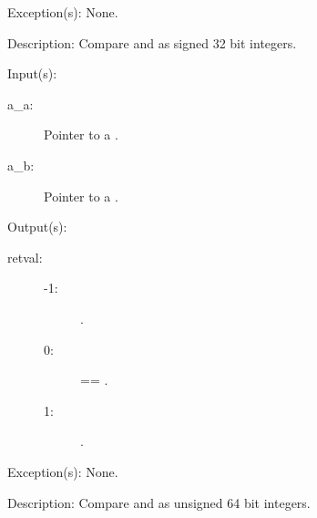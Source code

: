 \begin{capi}
\begin{capilist}
\begin{description}
		\end{description}
	\item[Exception(s): ] None.
	\item[Description: ]
		Compare  and  as signed 32 bit
		integers.
	\end{capilist}
\label{bhp_priority_compare_uint64}
	\begin{capilist}
	\item[Input(s): ]
		\begin{description}\item[]
		\item[a\_a: ]
			Pointer to a .
		\item[a\_b: ]
			Pointer to a .
		\end{description}
	\item[Output(s): ]
		\begin{description}\item[]
		\item[retval: ]
			\begin{description}\item[]
			\item[-1: ]  {\lt} .
			\item[0: ]  == .
			\item[1: ]  {\gt} .
			\end{description}
		\end{description}
	\item[Exception(s): ] None.
	\item[Description: ]
		Compare  and  as unsigned 64 bit
		integers.
	\end{capilist}
\end{capi}
